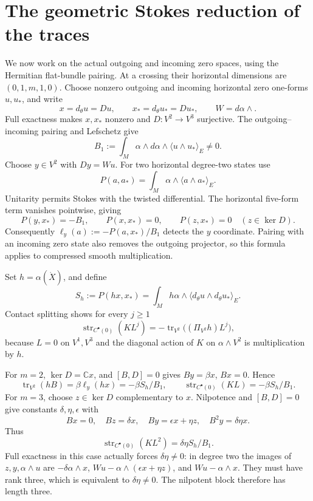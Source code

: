\documentclass[11pt]{article}
\newcommand{\tr}{\operatorname{tr}}
\newcommand{\str}{\operatorname{str}}
\begin{document}
\section{The geometric Stokes reduction of the traces}
We now work on the actual outgoing and incoming zero spaces, using
the Hermitian flat-bundle pairing. At a crossing their horizontal
dimensions are $(0,1,m,1,0)$. Choose nonzero outgoing and incoming
horizontal zero one-forms $u,u_*$, and write
\[
 x=d_\theta u=Du,\qquad x_*=d_\theta u_*=Du_*,\qquad
 W=d\alpha\wedge.
\]
Full exactness makes $x,x_*$ nonzero and $D:V^2\to V^3$ surjective.
The outgoing--incoming pairing and Lefschetz give
\[
 B_1:=\int_M\alpha\wedge d\alpha\wedge
                  \langle u\wedge u_*\rangle_E\ne0.
\]
Choose $y\in V^2$ with $Dy=Wu$. For two horizontal degree-two
states use
\[
 P(a,a_*)=\int_M\alpha\wedge\langle a\wedge a_*\rangle_E.
\]
Unitarity permits Stokes with the twisted differential. The horizontal
five-form term vanishes pointwise, giving
\begin{equation}\label{stokes}
 P(y,x_*)=-B_1,\qquad P(x,x_*)=0,\qquad
 P(z,x_*)=0\quad(z\in\ker D).
\end{equation}
Consequently $\ell_y(a):=-P(a,x_*)/B_1$ detects the $y$ coordinate.
Pairing with an incoming zero state also removes the outgoing
projector, so this formula applies to compressed smooth multiplication.

Set $h=\alpha(\dot X)$, and define
\[
 S_h:=P(hx,x_*)
      =\int_M h\alpha\wedge\langle d_\theta u\wedge
                                             d_\theta u_*\rangle_E.
\]
Contact splitting shows for every $j\ge1$
\begin{equation}\label{splittrace}
 \str_{C^\bullet(0)}(K L^j)
       =-\tr_{V^2}\bigl((\Pi_{V^2}h)L^j\bigr),
\end{equation}
because $L=0$ on $V^1,V^3$ and the diagonal action of $K$ on
$\alpha\wedge V^2$ is multiplication by $h$.

For $m=2$, $\ker D=\mathbb Cx$, and $[B,D]=0$ gives
$By=\beta x$, $Bx=0$. Hence
\[
 \tr_{V^2}(hB)=\beta\ell_y(hx)=-\beta S_h/B_1,
 \qquad \str_{C^\bullet(0)}(KL)=-\beta S_h/B_1.
\]
For $m=3$, choose $z\in\ker D$ complementary to $x$. Nilpotence
and $[B,D]=0$ give constants $\delta,\eta,\epsilon$ with
\[
 Bx=0,\quad Bz=\delta x,\quad By=\epsilon x+\eta z,
 \quad B^2y=\delta\eta x.
\]
Thus
\begin{equation}\label{rankthree}
 \str_{C^\bullet(0)}(KL^2)=\delta\eta S_h/B_1.
\end{equation}
Full exactness in this case actually forces $\delta\eta\ne0$:
in degree two the images of $z,y,\alpha\wedge u$ are
$-\delta\alpha\wedge x$,
$Wu-\alpha\wedge(\epsilon x+\eta z)$, and
$Wu-\alpha\wedge x$. They must have rank three, which is
equivalent to $\delta\eta\ne0$. The nilpotent block therefore has
length three.
\end{document}
